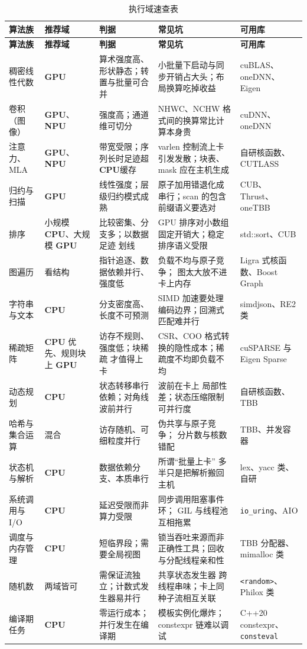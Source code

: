 \documentclass[12pt,a4paper,fontset=fandol]{ctexbook}
\newcommand{\cpp}[1]{C++#1}
\newcommand{\Tp}[1]{\texttt{#1}}
\newcommand{\Bk}{\allowbreak}
\newcommand{\Dom}[1]{\textsf{\bfseries #1}}
\newcommand{\CPU}{\Dom{CPU}}
\newcommand{\GPU}{\Dom{GPU}}
\newcommand{\NPU}{\Dom{NPU}}
\begin{document}
\begin{longtable}{@{}>{\raggedright\arraybackslash}p{}
  >{\raggedright\arraybackslash}p{}
  >{\raggedright\arraybackslash}p{}
  >{\raggedright\arraybackslash}p{}
  >{\raggedright\arraybackslash}p{}@{}}
\caption{执行域速查表}\label{tab:domain-cheatsheet}\\
\toprule
\textbf{算法族} & \textbf{推荐域} & \textbf{判据} & \textbf{常见坑} &
\textbf{可用库} \\
\midrule
\endfirsthead
\toprule
\textbf{算法族} & \textbf{推荐域} & \textbf{判据} & \textbf{常见坑} &
\textbf{可用库} \\
\midrule
\endhead
\bottomrule
\endfoot
稠密线性代数 & \GPU{} & 算术强度高、形状静态；转置与批量可合并 &
小批量下启动与同步开销占大头；布局换算吃掉收益 & cuBLAS、oneDNN、Eigen \\
卷积（图像） & \GPU{}、\NPU{} & 强度高；通道维可切分 & NHWC、NCHW
格式间的换算常比计算本身贵 & cuDNN、oneDNN \\
注意力、MLA & \GPU{}、\NPU{} & 带宽受限；序列长时足迹超 \CPU{}缓存 &
varlen 控制流上卡引发发散；块表、mask 应在主机生成 & 自研核函数、CUTLASS \\
归约与扫描 & \GPU{} & 线性强度；层级归约模式成熟 & 原子加用错退化成
串行；scan 的包含前缀语义要选对 & CUB、Thrust、oneTBB \\
排序 & 小规模 \CPU{}、大规模 \GPU{} & 比较密集、分支多；以数据足迹
划线 & GPU 排序对小数组固定开销大；稳定排序语义受限 & \Bk std::sort、CUB \\
图遍历 & 看结构 & 指针追逐、数据依赖并行、强度低 & 负载不均与原子竞争；
图太大放不进卡上内存 & Ligra 式核函数、Boost Graph \\
字符串与文本 & \CPU{} & 分支密度高、长度不可预测 & SIMD 加速要处理
编码边界；回溯式匹配难并行 & simdjson、RE2 类 \\
稀疏矩阵 & \CPU{} 优先、规则块上 \GPU{} & 访存不规则、强度低；块稀疏
才值得上卡 & CSR、COO 格式转换的隐性成本；稀疏度不均即负载不均 &
cuSPARSE 与 Eigen Sparse \\
动态规划 & \CPU{} & 状态转移串行依赖；对角线波前并行 & 波前在卡上
局部性差；状态压缩限制可并行度 & 自研核函数、TBB \\
哈希与集合运算 & 混合 & 访存随机、可细粒度并行 & 伪共享与原子竞争；
分片数与核数错配 & TBB、并发容器 \\
状态机与解析 & \CPU{} & 数据依赖分支、本质串行 & 所谓``批量上卡''
多半只是把解析搬回主机 & lex、yacc 类、自研 \\
系统调用与 I/O & \CPU{} & 延迟受限而非算力受限 & 同步调用阻塞事件环；
GIL 与线程池互相拖累 & \Tp{io\_uring}、AIO \\
调度与内存管理 & \CPU{} & 短临界段；需要全局视图 & 锁当吞吐来源而非
正确性工具；回收与分配线程亲和性 & TBB 分配器、mimalloc 类 \\
随机数 & 两域皆可 & 需保证流独立；计数式发生器易并行 & 共享状态发生器
跨线程串味；卡上同种子流相互关联 & \Tp{<random>}、Philox 类 \\
编译期任务 & \CPU{} & 零运行成本；并行发生在编译期 & 模板实例化爆炸；
constexpr 链难以调试 & \cpp{20} constexpr、\Tp{consteval} \\
\end{longtable}
\end{document}
